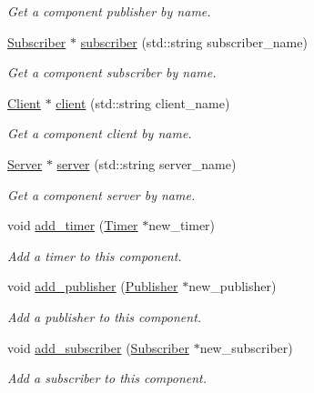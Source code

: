 \begin{DoxyCompactItemize}
\begin{DoxyCompactList}\small\item\em Get a component publisher by name. \end{DoxyCompactList}\item 
\hyperlink{classzcm_1_1Subscriber}{Subscriber} $\ast$ \hyperlink{classzcm_1_1Component_a1a7a463512fbac9e88d04d62ff5fc244}{subscriber} (std\+::string subscriber\+\_\+name)
\begin{DoxyCompactList}\small\item\em Get a component subscriber by name. \end{DoxyCompactList}\item 
\hyperlink{classzcm_1_1Client}{Client} $\ast$ \hyperlink{classzcm_1_1Component_af3be7d967a1fb16cf98adfe0b5b9e4ac}{client} (std\+::string client\+\_\+name)
\begin{DoxyCompactList}\small\item\em Get a component client by name. \end{DoxyCompactList}\item 
\hyperlink{classzcm_1_1Server}{Server} $\ast$ \hyperlink{classzcm_1_1Component_ae4501077c33b5f86e384e15f2b6bbc50}{server} (std\+::string server\+\_\+name)
\begin{DoxyCompactList}\small\item\em Get a component server by name. \end{DoxyCompactList}\item 
void \hyperlink{classzcm_1_1Component_ac9b656236674930c58f7dbfebb063da9}{add\+\_\+timer} (\hyperlink{classzcm_1_1Timer}{Timer} $\ast$new\+\_\+timer)
\begin{DoxyCompactList}\small\item\em Add a timer to this component. \end{DoxyCompactList}\item 
void \hyperlink{classzcm_1_1Component_a3d70420843fc7e0ff2d3d2edc422e992}{add\+\_\+publisher} (\hyperlink{classzcm_1_1Publisher}{Publisher} $\ast$new\+\_\+publisher)
\begin{DoxyCompactList}\small\item\em Add a publisher to this component. \end{DoxyCompactList}\item 
void \hyperlink{classzcm_1_1Component_ac07614093c36e61704d166f00f14c22e}{add\+\_\+subscriber} (\hyperlink{classzcm_1_1Subscriber}{Subscriber} $\ast$new\+\_\+subscriber)
\begin{DoxyCompactList}\small\item\em Add a subscriber to this component. \end{DoxyCompactList}\item 

\end{DoxyCompactItemize}
